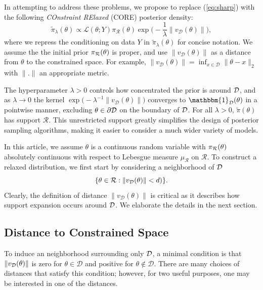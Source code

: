 \documentclass[10pt,fleqn]{article}
\DeclareMathOperator{\1}{\mathbbm{1}} \DeclareMathOperator{\bigO}{\mc O}
\begin{document}
In attempting to address these problems, we propose to replace (\ref{eq:sharp}) with the following {\em COnstraint RElaxed} (CORE) posterior density: 
\begin{equation}
\label{EQ:Rel_Dens_Motivation}
\tilde{\pi}_{\lambda}(\theta) \propto
\mathcal{L}(\theta; Y)  \pi_\mathcal{R}(\theta)
\exp\bigg(-\frac{1}{\lambda} \|v_\mathcal{D}(\theta)\|\bigg),
\end{equation}
where we repress the conditioning on data $Y$ in $\tilde{\pi}_{\lambda}(\theta)$ for concise notation.  We assume the the initial prior $\pi_{\mathcal{R}}(\theta)$ is proper, and use $\|v_\mathcal{D}(\theta)\|$ as
a distance from $\theta$ to the constrained space.  For example, $\|v_\mathcal{D}(\theta)\| = \inf_{x\in\mathcal{D}} \|\theta-x\|_2$ with $\|.\|$ an appropriate metric.

The hyperparameter $\lambda > 0$ controls how concentrated the prior is around 
${\mathcal{D}}$, and as $\lambda \to 0$ the kernel $\exp\big(- \lambda^{-1}\|v_\mathcal{D}(\theta)\|)$
converges to $\mathbbm{1}_\mathcal{D}(\theta)$ in a pointwise manner, excluding $\theta \in \partial {\mathcal{D}}$ on the boundary of ${\mathcal{D}}$.  For all $\lambda > 0$, $\tilde{\pi}(\theta)$ has 
support $\mathcal{R}$.  This unrestricted support greatly simplifies the design of 
posterior sampling algorithms, making it easier to consider a much wider
variety of models.

In this article, we assume $\theta$ is a continuous random variable with $\pi_{\mathcal{R}}(\theta)$
absolutely continuous with respect to Lebesgue measure $\mu_\mathcal{R}$ on $\mathcal{R}$. To construct a relaxed distribution, we first start by considering a neighborhood of ${\mathcal{D}}$
$$\{\theta\in \mathcal{R}: \|v_\mathcal{D}(\theta)\|< d) \}.$$
Clearly, the definition of distance $\|v_\mathcal{D}(\theta)\|$ is critical as it describes how support expansion occurs around $\mathcal{D}$. We elaborate the details in the next section.

\subsection{Distance to Constrained Space}

To induce an neighborhood surrounding only $\mathcal{D}$, a minimal condition is that $\|v_{\mathcal{D}}(\theta)\|$ is zero for $\theta \in \mathcal{D}$ and positive for $\theta\not\in\mathcal{D}$. There are many choices of distances that satisfy this condition; however, for two useful purposes, one may be interested in one of the distances.
\end{document}
